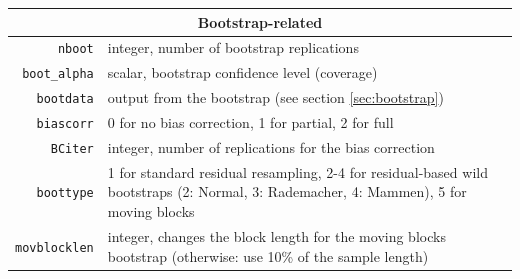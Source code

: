\documentclass[a4paper,10pt]{article}
\begin{document}
    \begin{tabular}{rp{}}
    \hline
    \multicolumn{2}{c}{\textbf{Bootstrap-related}} \\
    \hline
    \texttt{nboot}	 & integer, number of bootstrap replications \\
    \texttt{boot\_alpha} & scalar, bootstrap confidence level (coverage)\\
    \texttt{bootdata}	 & output from the bootstrap (see section \ref{sec:bootstrap})\\
    \texttt{biascorr}	 & 0 for no bias correction, 1 for
    partial, 2 for full\\
    \texttt{BCiter} & integer, number of replications for the bias correction \\
    \texttt{boottype}   & 1 for standard residual resampling, 2-4 for residual-based 
    wild bootstraps (2: Normal, 3: Rademacher, 4: Mammen), 5 for moving blocks \\
    \texttt{movblocklen} & integer, changes the block length for the moving blocks bootstrap
      (otherwise: use 10\% of the sample length)
     \end{tabular}
     
\end{document}
